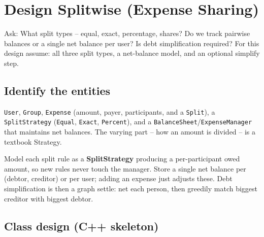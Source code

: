 \section{Design Splitwise (Expense Sharing)}
\label{sec:case-splitwise}


\begin{patternbox}
Ask: What split types -- equal, exact, percentage, shares? Do we track
pairwise balances or a single net balance per user? Is debt simplification
required? For this design assume: all three split types, a net-balance
model, and an optional simplify step.
\end{patternbox}

\subsection*{Identify the entities}

\texttt{User}, \texttt{Group}, \texttt{Expense} (amount, payer,
participants, and a \texttt{Split}), a \texttt{SplitStrategy}
(\texttt{Equal}, \texttt{Exact}, \texttt{Percent}), and a
\texttt{BalanceSheet}/\texttt{ExpenseManager} that maintains net balances.
The varying part -- how an amount is divided -- is a textbook Strategy.

\begin{ideabox}
Model each split rule as a \textbf{SplitStrategy} producing a
per-participant owed amount, so new rules never touch the manager. Store a
single net balance per (debtor, creditor) or per user; adding an expense
just adjusts these. Debt simplification is then a graph settle: net each
person, then greedily match biggest creditor with biggest debtor.
\end{ideabox}

\subsection*{Class design (C++ skeleton)}

